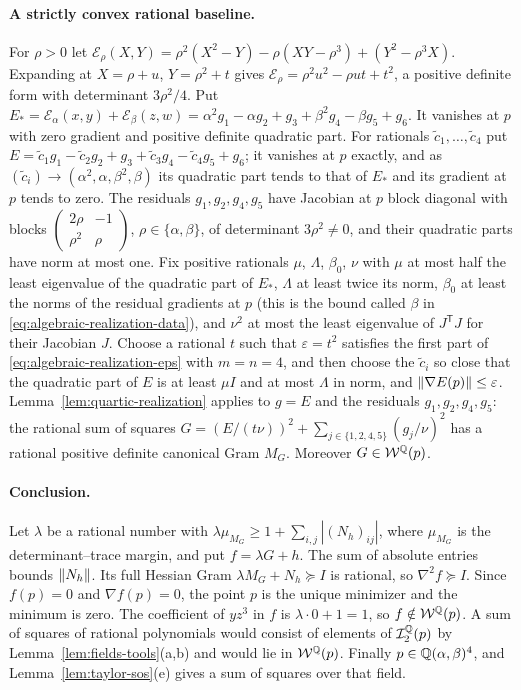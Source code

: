 \paragraph{A strictly convex rational baseline.}
For $\rho>0$ let
$\mathcal E_\rho(X,Y)=\rho^2(X^2-Y)-\rho(XY-\rho^3)+(Y^2-\rho^3X)$. Expanding at
$X=\rho+u$, $Y=\rho^2+t$ gives $\mathcal E_\rho=\rho^2u^2-\rho ut+t^2$, a
positive definite form with determinant $3\rho^2/4$. Put
$E_*=\mathcal E_\alpha(x,y)+\mathcal E_\beta(z,w)
=\alpha^2g_1-\alpha g_2+g_3+\beta^2g_4-\beta g_5+g_6$. It vanishes at $p$ with
zero gradient and positive definite quadratic part. For rationals
$\tilde c_1,\ldots,\tilde c_4$ put
$E=\tilde c_1g_1-\tilde c_2g_2+g_3+\tilde c_3g_4-\tilde c_4g_5+g_6$; it
vanishes at $p$ exactly, and as $(\tilde c_i)\to(\alpha^2,\alpha,\beta^2,\beta)$
its quadratic part tends to that of $E_*$ and its gradient at $p$ tends to
zero. The residuals $g_1,g_2,g_4,g_5$ have Jacobian at $p$ block diagonal
with blocks $\left(\begin{smallmatrix}2\rho&-1\\\rho^2&\rho\end{smallmatrix}\right)$,
$\rho\in\{\alpha,\beta\}$, of determinant $3\rho^2\ne0$, and their quadratic
parts have norm at most one. Fix positive rationals $\mu$, $\Lambda$,
$\beta_0$, $\nu$ with $\mu$ at most half the least eigenvalue of the quadratic
part of $E_*$, $\Lambda$ at least twice its norm, $\beta_0$ at least the norms
of the residual gradients at $p$ (this is the bound called $\beta$ in
\eqref{eq:algebraic-realization-data}), and $\nu^2$ at most the least
eigenvalue of $J^{\mathsf T}J$ for their Jacobian $J$. Choose a rational $t$ such that
$\varepsilon=t^2$ satisfies the first part of
\eqref{eq:algebraic-realization-eps} with $m=n=4$, and then choose the
$\tilde c_i$ so close that the quadratic part of $E$ is at least $\mu I$ and
at most $\Lambda$ in norm, and $\left\lVert\nabla E(p)\right\rVert\le\varepsilon$.
Lemma~\ref{lem:quartic-realization} applies to $g=E$ and the residuals
$g_1,g_2,g_4,g_5$: the rational sum of squares
$G=(E/(t\nu))^2+\sum_{j\in\{1,2,4,5\}}(g_j/\nu)^2$ has a rational positive
definite canonical Gram $M_G$. Moreover $G\in\mathcal W^\mathbb Q(p)$.

\paragraph{Conclusion.}
Let $\lambda$ be a rational number with
$\lambda\mu_{M_G}\ge1+\sum_{i,j}|(N_h)_{ij}|$, where $\mu_{M_G}$ is the
determinant--trace margin, and put $f=\lambda G+h$. The sum of absolute
entries bounds $\left\lVert N_h\right\rVert$. Its full Hessian Gram
$\lambda M_G+N_h\succeq I$ is rational, so $\nabla^2f\succeq I$. Since
$f(p)=0$ and $\nabla f(p)=0$, the point $p$ is the unique minimizer and the
minimum is zero. The coefficient of $yz^3$ in $f$ is $\lambda\cdot0+1=1$, so
$f\notin\mathcal W^\mathbb Q(p)$. A sum of squares of rational polynomials would
consist of elements of $\mathcal I_2^\mathbb Q(p)$ by
Lemma~\ref{lem:fields-tools}(a,b) and would lie in $\mathcal W^\mathbb Q(p)$. Finally
$p\in\mathbb Q(\alpha,\beta)^4$, and Lemma~\ref{lem:taylor-sos}(e) gives a sum of
squares over that field.

